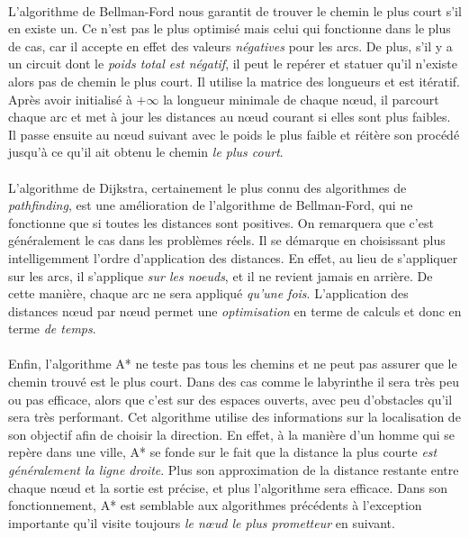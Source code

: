 \paragraph{} L'algorithme de Bellman-Ford nous garantit de trouver le chemin le plus court s'il en existe un. Ce n'est pas
le plus optimisé mais celui qui fonctionne dans le plus de cas, car il accepte en effet des valeurs \emph{négatives} pour les
arcs. De plus, s'il y a un circuit dont le \emph{poids total est négatif}, il peut le repérer et statuer qu'il n'existe alors
pas de chemin le plus court. Il utilise la matrice des longueurs et est itératif. Après avoir initialisé à $+\infty$ la 
longueur minimale de chaque n\oe{}ud, il parcourt chaque arc et met à jour les distances au n\oe{}ud courant si elles sont
plus faibles. Il passe ensuite au n\oe{}ud suivant avec le poids le plus faible et réitère son procédé jusqu'à ce qu'il ait
obtenu le chemin \emph{le plus court}.

\paragraph{} L'algorithme de Dijkstra, certainement le plus connu des algorithmes de \emph{pathfinding}, est une amélioration
de l'algorithme de Bellman-Ford, qui ne fonctionne que si toutes les distances sont positives. On remarquera que c'est généralement
le cas dans les problèmes réels. Il se démarque en choisissant plus intelligemment l'ordre d'application des distances. En effet,
au lieu de s'appliquer sur les arcs, il s'applique \emph{sur les noeuds}, et il ne revient jamais en arrière. De cette manière,
chaque arc ne sera appliqué \emph{qu'une fois}. L'application des distances n\oe{}ud par n\oe{}ud permet une \emph{
optimisation} en terme de calculs et donc en terme \emph{de temps}.

\paragraph{} Enfin, l'algorithme A* ne teste pas tous les chemins et ne peut pas assurer que le chemin trouvé est le
plus court. Dans des cas comme le labyrinthe il sera très peu ou pas efficace, alors que c'est sur des espaces ouverts,
avec peu d'obstacles qu'il sera très performant. Cet algorithme utilise des informations sur la localisation de son
objectif afin de choisir la direction. En effet, à la manière d'un homme qui se repère dans une ville, A* se fonde sur le
fait que la distance la plus courte \emph{est généralement la ligne droite}. Plus son approximation de la distance 
restante entre chaque n\oe{}ud et la sortie est précise, et plus l'algorithme sera efficace. Dans son fonctionnement, A*
est semblable aux algorithmes précédents à l'exception importante qu'il visite toujours \emph{le n\oe{}ud le plus
prometteur} en suivant.

